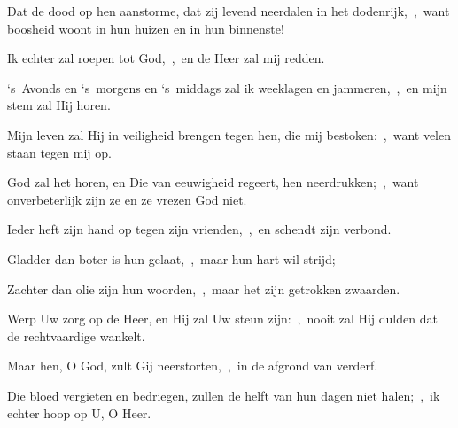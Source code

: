 \documentclass[12pt,twoside,a5paper]{article}
\begin{document}
\begin{halfparskip}
  Dat de dood op hen aanstorme, dat zij levend neerdalen in het dodenrijk,~\sep\ want boosheid woont in hun huizen en in hun binnenste!

  Ik echter zal roepen tot God,~\sep\ en de Heer zal mij redden.

  `s~Avonds en `s~morgens en `s~middags zal ik weeklagen en jammeren,~\sep\ en mijn stem zal Hij horen.

  Mijn leven zal Hij in veiligheid brengen tegen hen, die mij bestoken:~\sep\ want velen staan tegen mij op.

  God zal het horen, en Die van eeuwigheid regeert, hen neerdrukken;~\sep\ want onverbeterlijk zijn ze en ze vrezen God niet.

  Ieder heft zijn hand op tegen zijn vrienden,~\sep\ en schendt zijn verbond.

  Gladder dan boter is hun gelaat,~\sep\ maar hun hart wil strijd;

  Zachter dan olie zijn hun woorden,~\sep\ maar het zijn getrokken zwaarden.

  Werp Uw zorg op de Heer, en Hij zal Uw steun zijn:~\sep\ nooit zal Hij dulden dat de rechtvaardige wankelt.

  Maar hen, O God, zult Gij neerstorten,~\sep\ in de afgrond van verderf.

  Die bloed vergieten en bedriegen, zullen de helft van hun dagen niet halen;~\sep\ ik echter hoop op U, O Heer.
\end{halfparskip}
\end{document}
